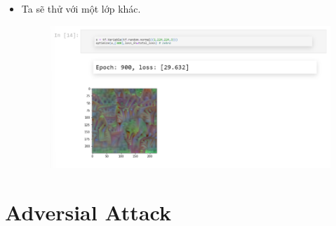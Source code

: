 \documentclass{book}
\begin{document}
\begin{itemize}
	\item Ta sẽ thử với một lớp khác.
	\begin{figure}[H]
		\centering
		\includegraphics[width=0.75\linewidth]{images/ad8_train.png}
	\end{figure}
\end{itemize}

\section{Adversial Attack}
\end{document}
